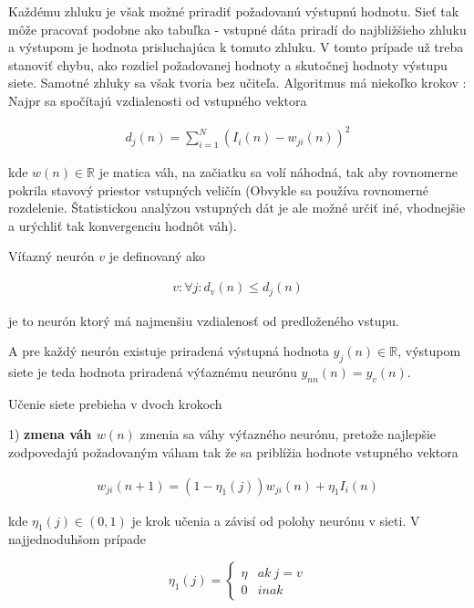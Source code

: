 Každému zhluku je však možné priradiť požadovanú výstupnú hodnotu. Sieť tak môže
pracovať podobne ako tabuľka - vstupné dáta priradí do najbližšieho zhluku a výstupom
je hodnota prisluchajúca k tomuto zhluku. V tomto prípade už treba stanoviť chybu,
ako rozdiel požadovanej hodnoty a skutočnej hodnoty výstupu siete. Samotné
zhluky sa však tvoria bez učiteľa.
Algoritmus má niekoľko krokov :
\\
Najpr sa spočítajú vzdialenosti od vstupného vektora

\begin{align}
d_j(n) = \sum\limits_{i=1}^{N}{(I_i(n) - w_{ji}(n))^2}
\label{eq:knn_distance}
\end{align}

kde $w(n) \in \mathbb{R}$ je matica váh, na začiatku sa volí náhodná, tak
aby rovnomerne pokrila stavový priestor vstupných veličín (Obvykle sa používa rovnomerné
rozdelenie. Štatistickou analýzou vstupných dát je ale možné určiť iné, vhodnejšie
a urýchliť tak konvergenciu hodnôt váh).

Víťazný neurón $v$ je definovaný ako

\begin{align}
v : \forall j : d_v(n) \leq d_j(n)
\label{eq:knn_winning}
\end{align}

je to neurón ktorý má najmenšiu vzdialenosť od predloženého vstupu.

A pre každý neurón existuje priradená výstupná hodnota $y_j(n) \in \mathbb{R}$, výstupom
siete je teda hodnota priradená výťaznému neurónu $y_{nn}(n) = y_v(n)$.


Učenie siete prebieha v dvoch krokoch

{1) \bf zmena váh $w(n)$ } zmenia sa váhy výťazného neurónu, pretože najlepšie
zodpovedajú požadovaným váham tak že sa priblížia hodnote vstupného vektora

\begin{align}
w_{ji}(n+1) = (1-\eta_1(j))w_{ji}(n) + \eta_1 I_i(n)
\label{eq:knn_w_update}
\end{align}

kde $\eta_1(j) \in (0, 1)$ je krok učenia a závisí od polohy neurónu v sieti.
V najjednoduhšom prípade

\begin{equation}
\eta_1(j) =
\left\{
	\begin{array}{ll}
		\eta  & ak \ j = v \\
		0 & inak
	\end{array}
\right.
\label{eq:knn_func_simple1}
\end{equation}

